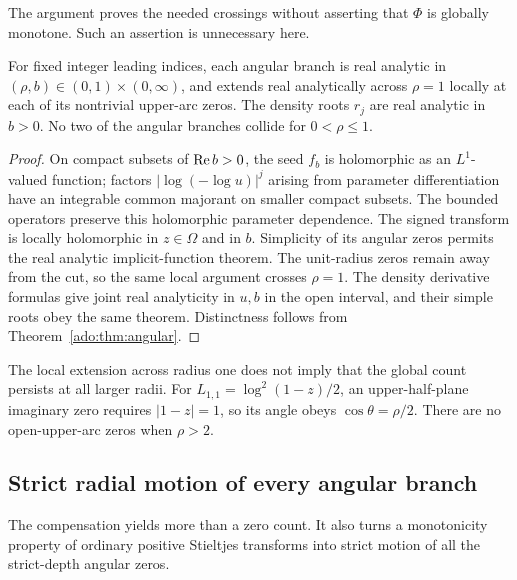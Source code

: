 The argument proves the needed crossings without asserting that
$\Phi$ is globally monotone. Such an assertion is unnecessary here.

\begin{corollary}
\label{ado:cor:analyticbranches}
For fixed integer leading indices, each angular branch is real analytic
in $(\rho,b)\in(0,1)\times(0,\infty)$, and extends real analytically
across $\rho=1$ locally at each of its nontrivial upper-arc zeros.
The density roots $r_j$ are real analytic in $b>0$. No two of the
angular branches collide for $0<\rho\le1$.
\end{corollary}
\begin{proof}
On compact subsets of $\operatorname{Re} b>0$, the seed $f_b$ is holomorphic as
an $L^1$-valued function; factors $|\log(-\log u)|^j$ arising from
parameter differentiation have an integrable common majorant on smaller
compact subsets. The bounded operators preserve this holomorphic
parameter dependence. The signed transform is locally holomorphic in
$z\in\Omega$ and in $b$. Simplicity of its angular zeros permits the
real analytic implicit-function theorem. The unit-radius zeros remain
away from the cut, so the same local argument crosses $\rho=1$.
The density derivative formulas give joint real analyticity in $u,b$
in the open interval, and their simple roots obey the same theorem.
Distinctness follows from Theorem~\ref{ado:thm:angular}.
\end{proof}
The local extension across radius one does not imply that the global
count persists at all larger radii. For $L_{1,1}=\log^2(1-z)/2$, an
upper-half-plane imaginary zero requires $|1-z|=1$, so its angle obeys
$\cos\theta=\rho/2$. There are no open-upper-arc zeros when $\rho>2$.

\subsection{Strict radial motion of every angular branch}
The compensation yields more than a zero count. It also turns a
monotonicity property of ordinary positive Stieltjes transforms into
strict motion of all the strict-depth angular zeros.

